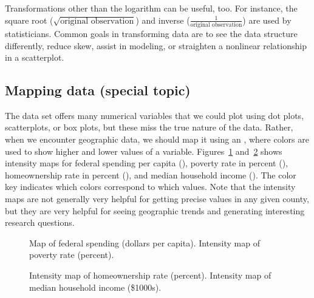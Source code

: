 Transformations other than the logarithm can be useful, too. For instance, the square root ($\sqrt{\text{original observation}}$) and inverse ($\frac{1}{\text{original observation}}$) are used by statisticians. Common goals in transforming data are to see the data structure differently, reduce skew, assist in modeling, or straighten a nonlinear relationship in a scatterplot.


\subsection{Mapping data (special topic)}


The  data set offers many numerical variables that we could plot using dot plots, scatterplots, or box plots, but these miss the true nature of the data. Rather, when we encounter geographic data, we should map it using an , where colors are used to show higher and lower values of a variable. Figures~\ref{countyIntensityMaps1} and~\ref{countyIntensityMaps2} shows intensity maps for federal spending per capita (), poverty rate in percent (), homeownership rate in percent (), and median household income (). The color key indicates which colors correspond to which values. Note that the intensity maps are not generally very helpful for getting precise values in any given county, but they are very helpful for seeing geographic trends and generating interesting research questions.

\begin{figure}
\centering
{}
\caption{ Map of federal spending (dollars per capita).  Intensity map of poverty rate (percent).}
\label{countyIntensityMaps1}
\end{figure}

\begin{figure}
\centering
{}
\caption{ Intensity map of homeownership rate (percent).  Intensity map of median household income (\$1000s).}
\label{countyIntensityMaps2}
\end{figure}


